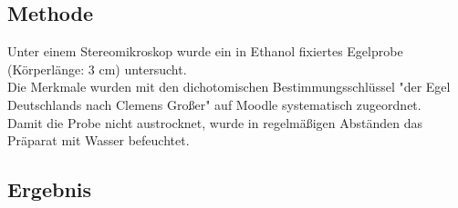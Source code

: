 \documentclass[oneside,10pt,a4paper]{report}
\begin{document}
			\subsection{Methode}
				Unter einem Stereomikroskop wurde ein in Ethanol fixiertes Egelprobe (Körperlänge: 3 cm) untersucht.\\
				Die Merkmale wurden mit den dichotomischen Bestimmungsschlüssel "der Egel Deutschlands nach Clemens Großer" auf Moodle systematisch zugeordnet.\\
				Damit die Probe nicht austrocknet, wurde in regelmäßigen Abständen das Präparat mit Wasser befeuchtet.
			
			\subsection{Ergebnis}
			
\end{document}
